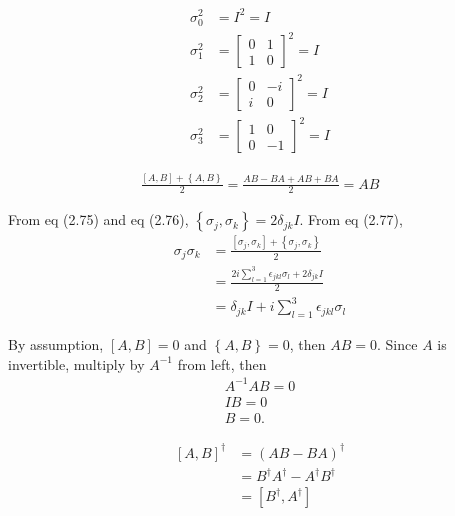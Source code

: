 \begin{align*}
	\sigma_0^2 &= I^2 = I\\
%
	\sigma_1^2 &= \begin{bmatrix}
	0 & 1 \\
	1 & 0
	\end{bmatrix} ^2 = I\\
%
	\sigma_2^2 &= \begin{bmatrix}
	0 & -i \\
	i & 0
	\end{bmatrix} ^2 = I\\
%
	\sigma_3^2 &= \begin{bmatrix}
	1 & 0 \\
	0 & -1
	\end{bmatrix} ^2 = I
\end{align*}



\begin{align*}
	\frac{\left[A, B \right] + \left\{A, B\right\}}{2} = \frac{AB - BA + AB + BA}{2} = AB
\end{align*}




From eq (2.75) and eq (2.76), $\left\{\sigma_j,  \sigma_k \right\} = 2 \delta_{jk} I$.
From eq (2.77),
\begin{align*}
	\sigma_j \sigma_k &= \frac{\left[\sigma_j, \sigma_k  \right] + \left\{\sigma_j, \sigma_k \right\}}{2}\\
		&= \frac{2i \sum_{l=1}^{3} \epsilon_{jkl}\sigma_l +  2 \delta_{jk} I}{2}\\
		&= \delta_{jk} I + i \sum_{l=1}^{3} \epsilon_{jkl}\sigma_l
\end{align*}



By assumption, $\left[A, B\right] = 0$ and $\left\{A, B\right\} = 0$, then $AB = 0$.
Since $A$ is invertible, multiply by $A^{-1}$ from left, then
\begin{align*}
	A^{-1} AB = 0\\
	IB = 0\\
	B=0.
\end{align*}


\begin{align*}
	\left[A, B\right]^\dagger &= (AB -BA)^\dagger\\
		&= B^\dagger A^\dagger - A^\dagger B^\dagger\\
		&= \left[B^\dagger, A^\dagger \right]
\end{align*}



